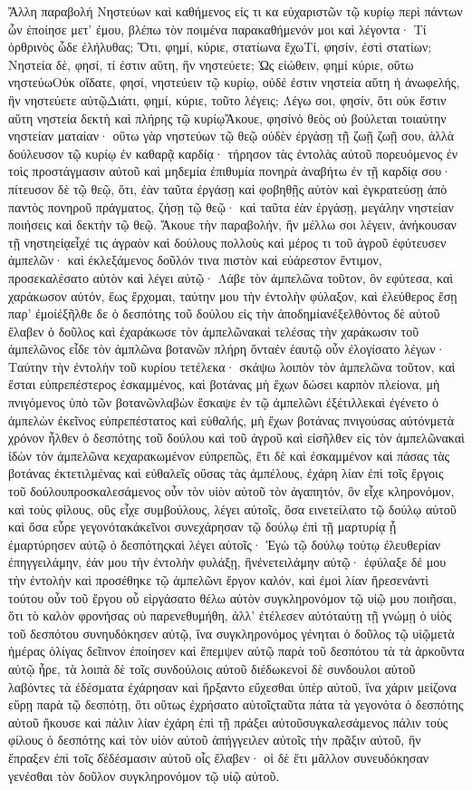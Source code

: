Ἄλλη παραβολή 
Νηστεύων καὶ καθήμενος εἰς τι κα εὐχαριστῶν τῷ κυρίῳ περὶ πάντων ὧν ἐποίησε μετ’ ἐμου, βλέπω τὸν ποιμένα παρακαθήμενόν μοι καὶ λέγοντα· Τί ὀρθρινὸς ὧδε ἐλήλυθας; Ὅτι, φημί, κύριε, στατίωνα ἔχωΤί, φησίν, ἐστὶ στατίων; Νηστεία δὲ, φησί, τί ἐστιν αὕτη, ἣν νηστεύετε; Ὡς εἰώθειν, φημί κύριε, οὕτω νηστεύωΟὐκ οἴδατε, φησί, νηστεύειν τῷ κυρίῳ, οὐδέ ἐστιν νηστεία αὕτη ἡ ἀνωφελής, ἣν νηστεύετε αὐτῷΔιάτι, φημί, κύριε, τοῦτο λέγεις; Λέγω σοι, φησίν, ὅτι οὐκ ἔστιν αὕτη νηστεία δεκτὴ καὶ πλήρης τῷ κυρίῳἌκουε, φησίνὁ θεὸς οὐ βούλεται τοιαύτην νηστείαν ματαίαν· οὕτω γὰρ νηστεύων τῷ θεῷ οὐδὲν ἐργάσῃ τῇ ζωῇ ζωῇ σου, ἀλλὰ δούλευσον τῷ κυρίῳ ἐν καθαρᾷ καρδίᾳ· τήρησον τὰς ἐντολὰς αὐτοῦ πορευόμενος ἐν τοὶς προστάγμασιν αὐτοῦ καὶ μηδεμία ἐπιθυμία πονηρὰ ἀναβήτω ἐν τῇ καρδίᾳ σου· πίτευσον δὲ τῷ θεῷ, ὅτι, ἐὰν ταῦτα ἐργάσῃ καὶ φοβηθῇς αὐτὸν καὶ ἐγκρατεύσῃ ἀπὸ παντὸς πονηροῦ πράγματος, ζήσῃ τῷ θεῷ· καὶ ταῦτα ἐὰν ἐργάσῃ, μεγάλην νηστείαν ποιήσεις καὶ δεκτὴν τῷ θεῷ.
Ἄκουε τὴν παραβολήν, ἣν μέλλω σοι λέγειν, ἀνήκουσαν τῇ νηστηείᾳεἶχέ τις ἀγραὸν καὶ δούλους πολλοὺς καὶ μέρος τι τοῦ ἀγροῦ ἐφύτευσεν ἀμπελῶν· καὶ ἐκλεξάμενος δοῦλόν τινα πιστὸν καὶ εὐάρεστον ἔντιμον, προσεκαλέσατο αὐτὸν καὶ λέγει αὐτῷ· Λάβε τὸν ἀμπελῶνα τοῦτον, ὃν εφύτεσα, καὶ χαράκωσον αὐτόν, ἕως ἔρχομαι, ταύτην μου τὴν ἐντολὴν φύλαξον, καὶ ἐλεύθερος ἔσῃ παρ’ ἐμοίἐξῆλθε δε ὁ δεσπότης τοῦ δούλου εἰς τὴν ἀποδημίανἐξελθόντος δὲ αὐτοῦ ἔλαβεν ὁ δοῦλος καὶ ἐχαράκωσε τὸν ἀμπελῶνακαὶ τελέσας τὴν χαράκωσιν τοῦ ἀμπελῶνος εἶδε τὸν ἀμπλῶνα βοτανῶν πλήρη ὄνταἐν ἑαυτῷ οὖν ἐλογίσατο λέγων· Ταύτην τὴν ἐντολὴν τοῦ κυρίου τετέλεκα· σκάψω λοιπὸν τὸν ἀμπελῶνα τοῦτον, καὶ ἔσται εὐπρεπέστερος ἐσκαμμένος, καὶ βοτάνας μὴ ἔχων δώσει καρπὸν πλείονα, μὴ πνιγόμενος ὑπὸ τῶν βοτανῶνλαβὼν ἔσκαψε ἐν τῷ ἀμπελῶνι ἐξέτιλλεκαὶ ἐγένετο ὁ ἀμπελὼν ἐκεῖνος εὐπρεπέστατος καὶ εὐθαλής, μὴ ἔχων βοτάνας πνιγούσας αὐτόνμετὰ χρόνον ἦλθεν ὁ δεσπότης τοῦ δούλου καὶ τοῦ ἀγροῦ καὶ εἰσῆλθεν εἰς τὸν ἀμπελῶνακαὶ ἰδὼν τὸν ἀμπελῶνα κεχαρακωμένον εὐπρεπῶς, ἔτι δὲ καὶ ἐσκαμμένον καὶ πάσας τὰς βοτάνας ἐκτετιλμένας καὶ εὐθαλεῖς οὔσας τὰς ἀμπέλους, ἐχάρη λίαν ἐπὶ τοῖς ἔργοις τοῦ δούλουπροσκαλεσάμενος οὖν τὸν υἱὸν αὐτοῦ τὸν ἀγαπητόν, ὃν εἶχε κληρονόμον, καὶ τοὺς φίλους, οὓς εἶχε συμβούλους, λέγει αὐτοῖς, ὅσα εινετείλατο τῷ δούλῳ αὐτοῦ καὶ ὅσα εὗρε γεγονότακἀκεῖνοι συνεχάρησαν τῷ δούλῳ ἐπὶ τῇ μαρτυρίᾳ ᾗ ἐμαρτύρησεν αὐτῷ ὁ δεσπότηςκαὶ λέγει αὐτοῖς· Ἐγὼ τῷ δούλῳ τούτῳ ἐλευθερίαν ἐπηγγειλάμην, ἐάν μου τὴν ἐντολὴν φυλάξῃ, ἣνἐνετειλάμην αὐτῷ· ἐφύλαξε δέ μου τὴν ἐντολὴν καὶ προσέθηκε τῷ ἀμπελῶνι ἔργον καλόν, καὶ ἐμοὶ λίαν ἤρεσενἀντὶ τούτου οὖν τοῦ ἔργου οὗ εἰργάσατο θέλω αὐτὸν συγκληρονόμον τῷ υἱῷ μου ποιῆσαι, ὅτι τὸ καλὸν φρονήσας οὐ παρενεθυμήθη, ἀλλ’ ἐτέλεσεν αὐτόταύτῃ τῇ γνώμῃ ὁ υἱὸς τοῦ δεσπότου συνηυδόκησεν αὐτῷ, ἵνα συγκληρονόμος γένηται ὁ δοῦλος τῷ υἱῷμετὰ ἡμέρας ὀλίγας δεῖπνον ἐποίησεν καὶ ἔπεμψεν αὐτῷ παρὰ τοῦ δεσπότου τὰ τὰ ἀρκοῦντα αὐτῷ ἦρε, τὰ λοιπὰ δὲ τοῖς συνδούλοις αὐτοῦ διέδωκενοἱ δὲ συνδουλοι αὐτοῦ λαβόντες τὰ ἐδέσματα ἐχάρησαν καὶ ἤρξαντο εὔχεσθαι ὑπὲρ αὐτοῦ, ἵνα χάριν μείζονα εὕρῃ παρὰ τῷ δεσπότῃ, ὅτι οὕτως ἐχρήσατο αὐτοῖςταῦτα πάτα τὰ γεγονότα ὁ δεσπότης αὐτοῦ ἤκουσε καὶ πάλιν λίαν ἐχάρη ἐπὶ τῇ πράξει αὐτοῦσυγκαλεσάμενος πάλιν τοὺς φίλους ὁ δεσπότης καὶ τὸν υἱὸν αὐτοῦ ἀπήγγειλεν αὐτοῖς τὴν πρᾶξιν αὐτοῦ, ἣν ἔπραξεν ἐπὶ τοῖς δ̓ἐδέσμασιν αὐτοῦ οἷς ἔλαβεν· οἱ δὲ ἔτι μᾶλλον συνευδόκησαν γενέσθαι τὸν δοῦλον συγκληρονόμον τῷ υἱῷ αὐτοῦ.
